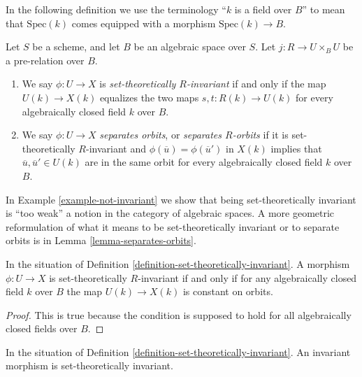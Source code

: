 \noindent
In the following definition we use the terminology ``$k$ is a field
over $B$'' to mean that $\text{Spec}(k)$ comes equipped with a morphism
$\text{Spec}(k) \to B$.

\begin{definition}
\label{definition-set-theoretically-invariant}
Let $S$ be a scheme, and let $B$ be an algebraic space over $S$.
Let $j : R \to U \times_B U$ be a pre-relation over $B$.
\begin{enumerate}
\item We say $\phi : U \to X$ is {\it set-theoretically $R$-invariant}
if and only if the map $U(k) \to X(k)$ equalizes the two maps
$s, t : R(k) \to U(k)$ for every algebraically closed field $k$
over $B$.
\item We say $\phi : U \to X$ {\it separates orbits}, or
{\it separates $R$-orbits} if it is set-theoretically $R$-invariant and
$\phi(\overline{u}) = \phi(\overline{u}')$ in $X(k)$ implies that
$\overline{u}, \overline{u}' \in U(k)$ are in the same orbit
for every algebraically closed field $k$ over $B$.
\end{enumerate}
\end{definition}

\noindent
In
Example \ref{example-not-invariant}
we show that being set-theoretically invariant is ``too weak'' a notion in
the category of algebraic spaces. A more geometric reformulation
of what it means to be set-theoretically invariant or to separate orbits is in
Lemma \ref{lemma-separates-orbits}.

\begin{lemma}
\label{lemma-set-theoretic-invariant}
In the situation of Definition \ref{definition-set-theoretically-invariant}.
A morphism $\phi : U \to X$ is set-theoretically $R$-invariant if and
only if for any algebraically closed field $k$ over $B$ the map
$U(k) \to X(k)$ is constant on orbits.
\end{lemma}

\begin{proof}
This is true because the condition is supposed to hold for all algebraically
closed fields over $B$.
\end{proof}

\begin{lemma}
\label{lemma-invariant-set-theoretically-invariant}
In the situation of Definition \ref{definition-set-theoretically-invariant}.
An invariant morphism is set-theoretically invariant.
\end{lemma}

